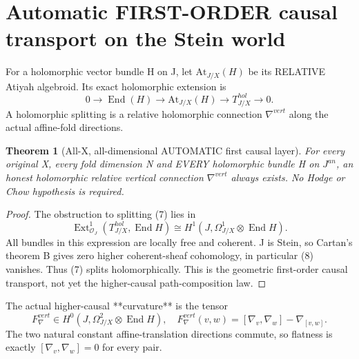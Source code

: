 \documentclass[11pt]{article}
\newtheorem{theorem}{Theorem}
\begin{document}
\section{Automatic FIRST-ORDER causal transport on the Stein world}
For a holomorphic vector bundle H on J,
let $\mathrm{At}_{J/X}(H)$ be its
RELATIVE Atiyah algebroid.
Its exact holomorphic extension is
\[
 0\to\operatorname{End}(H)
 \to\mathrm{At}_{J/X}(H)
 \to T_{J/X}^{hol}\to0.
 \tag{7}
\]
A holomorphic splitting is a
relative holomorphic connection
$\nabla^{vert}$ along the actual
affine-fold directions.

\begin{theorem}[All-X, all-dimensional AUTOMATIC first causal layer]
For every original X, every fold dimension N
and EVERY holomorphic bundle H on $J^{an}$,
an honest holomorphic relative vertical connection
$\nabla^{vert}$ always exists.
No Hodge or Chow hypothesis is required.
\end{theorem}
\begin{proof}
The obstruction to splitting (7) lies in
\[
 \operatorname{Ext}^1_{\mathcal O_J}
 (T_{J/X}^{hol},\operatorname{End}H)
 \cong H^1(J,\Omega^1_{J/X}
                 \otimes\operatorname{End}H).
 \tag{8}
\]
All bundles in this expression are locally free
and coherent. J is Stein, so Cartan's theorem B
gives zero higher coherent-sheaf cohomology,
in particular (8) vanishes. Thus (7) splits
holomorphically. This is the geometric
first-order causal transport, not yet the
higher-causal path-composition law.
\end{proof}

The actual higher-causal **curvature**
is the tensor
\[
 \boxed{
 F^{vert}_{\nabla}\in
 H^0\!\left(J,\Omega^2_{J/X}
                        \otimes\operatorname{End}H\right),
 \quad
 F^{vert}_{\nabla}(v,w)
 =[\nabla_v,\nabla_w]-\nabla_{[v,w]}.
 }                                                       \tag{9}
\]
The two natural constant affine-translation
directions commute, so flatness is exactly
$[\nabla_v,\nabla_w]=0$ for every pair.
\end{document}
